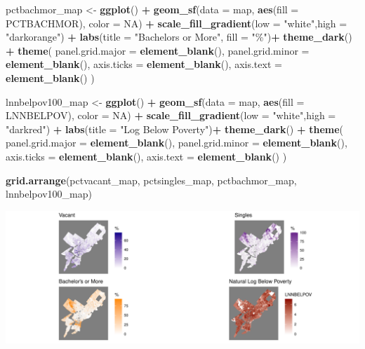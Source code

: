 \documentclass[
]{article}
\newenvironment{Shaded}{\begin{snugshade}}{\end{snugshade}}
\newcommand{\AttributeTok}[1]{\textcolor[rgb]{0.13,0.29,0.53}{#1}}
\newcommand{\ConstantTok}[1]{\textcolor[rgb]{0.56,0.35,0.01}{#1}}
\newcommand{\FunctionTok}[1]{\textcolor[rgb]{0.13,0.29,0.53}{\textbf{#1}}}
\newcommand{\NormalTok}[1]{#1}
\newcommand{\OtherTok}[1]{\textcolor[rgb]{0.56,0.35,0.01}{#1}}
\newcommand{\SpecialCharTok}[1]{\textcolor[rgb]{0.81,0.36,0.00}{\textbf{#1}}}
\newcommand{\StringTok}[1]{\textcolor[rgb]{0.31,0.60,0.02}{#1}}
\begin{document}
\begin{Shaded}
\begin{Highlighting}[]
\NormalTok{pctbachmor\_map }\OtherTok{\textless{}{-}} \FunctionTok{ggplot}\NormalTok{() }\SpecialCharTok{+}
  \FunctionTok{geom\_sf}\NormalTok{(}\AttributeTok{data =}\NormalTok{ map, }\FunctionTok{aes}\NormalTok{(}\AttributeTok{fill =}\NormalTok{ PCTBACHMOR), }\AttributeTok{color =} \ConstantTok{NA}\NormalTok{) }\SpecialCharTok{+}
  \FunctionTok{scale\_fill\_gradient}\NormalTok{(}\AttributeTok{low =} \StringTok{"white"}\NormalTok{,}\AttributeTok{high =} \StringTok{"darkorange"}\NormalTok{) }\SpecialCharTok{+}
  \FunctionTok{labs}\NormalTok{(}\AttributeTok{title =} \StringTok{"Bachelor\textquotesingle{}s or More"}\NormalTok{,}
       \AttributeTok{fill =} \StringTok{"\%"}\NormalTok{)}\SpecialCharTok{+}
  \FunctionTok{theme\_dark}\NormalTok{() }\SpecialCharTok{+}
  \FunctionTok{theme}\NormalTok{( }
    \AttributeTok{panel.grid.major =} \FunctionTok{element\_blank}\NormalTok{(),}
    \AttributeTok{panel.grid.minor =} \FunctionTok{element\_blank}\NormalTok{(),}
    \AttributeTok{axis.ticks =} \FunctionTok{element\_blank}\NormalTok{(),}
    \AttributeTok{axis.text =} \FunctionTok{element\_blank}\NormalTok{()}
\NormalTok{    )}

\NormalTok{lnnbelpov100\_map }\OtherTok{\textless{}{-}} \FunctionTok{ggplot}\NormalTok{() }\SpecialCharTok{+}
  \FunctionTok{geom\_sf}\NormalTok{(}\AttributeTok{data =}\NormalTok{ map, }\FunctionTok{aes}\NormalTok{(}\AttributeTok{fill =}\NormalTok{ LNNBELPOV), }\AttributeTok{color =} \ConstantTok{NA}\NormalTok{) }\SpecialCharTok{+}
  \FunctionTok{scale\_fill\_gradient}\NormalTok{(}\AttributeTok{low =} \StringTok{"white"}\NormalTok{,}\AttributeTok{high =} \StringTok{"darkred"}\NormalTok{) }\SpecialCharTok{+}
  \FunctionTok{labs}\NormalTok{(}\AttributeTok{title =} \StringTok{"Log Below Poverty"}\NormalTok{)}\SpecialCharTok{+}
  \FunctionTok{theme\_dark}\NormalTok{() }\SpecialCharTok{+}
  \FunctionTok{theme}\NormalTok{( }
    \AttributeTok{panel.grid.major =} \FunctionTok{element\_blank}\NormalTok{(),}
    \AttributeTok{panel.grid.minor =} \FunctionTok{element\_blank}\NormalTok{(),}
    \AttributeTok{axis.ticks =} \FunctionTok{element\_blank}\NormalTok{(),}
    \AttributeTok{axis.text =} \FunctionTok{element\_blank}\NormalTok{()}
\NormalTok{    )}

\FunctionTok{grid.arrange}\NormalTok{(pctvacant\_map, pctsingles\_map, pctbachmor\_map, lnnbelpov100\_map)}
\end{Highlighting}
\end{Shaded}

\includegraphics{HW1-Regression_files/figure-latex/variables maps-1.pdf}
\end{document}
